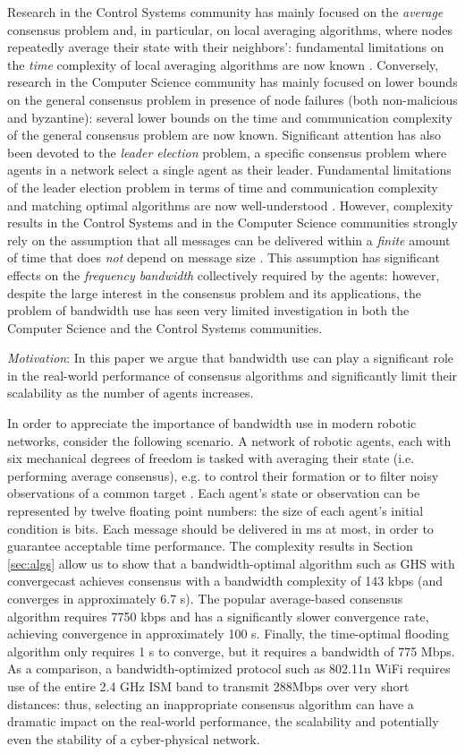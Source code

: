 \documentclass[letterpaper,10pt,conference]{ieeeconf}
\begin{document}
Research in the Control Systems community has mainly focused on the \emph{average} consensus problem and, in particular, on local averaging algorithms, where nodes repeatedly average their state with their neighbors': fundamental limitations on the \emph{time} complexity of local averaging algorithms are now known \cite{AO-JNT:07}.
Conversely, research in the Computer Science community has mainly focused on lower bounds on the general consensus problem in presence of node failures (both non-malicious and byzantine): several lower bounds on the time and communication complexity of the general consensus problem are now known. Significant attention has also been devoted to the  \emph{leader election} problem, a specific consensus problem where agents in a network select a single agent as their leader. Fundamental limitations of the leader election problem in terms of time and communication complexity and matching optimal algorithms are now well-understood \cite{NL:96}.
However, complexity results in the Control Systems and in the Computer Science communities strongly rely on the assumption that all messages can be delivered within a \emph{finite} amount of time that does \emph{not} depend on message size \cite{NL:96}. This assumption has significant effects on the \emph{frequency bandwidth} collectively required by the agents: however, despite the large interest in the consensus problem and its applications, the problem of bandwidth use has seen very limited investigation in both the Computer Science and the Control Systems communities. 

\emph{Motivation}:
In this paper we argue that bandwidth use can play a significant role in the real-world performance of consensus algorithms and significantly limit their scalability as the number of agents increases.

In order to appreciate the importance of bandwidth use in modern robotic networks, consider the following scenario. A network of  robotic agents, each with six mechanical degrees of freedom is tasked with averaging their state (i.e. performing average consensus), e.g. to control their formation \cite{WR-RWB-EMA:07} or to filter noisy observations of a common target \cite{ROS:07}. Each agent's state or observation can be represented by twelve floating point numbers:  the size of each agent's initial condition is  bits. Each message should be delivered in  ms at most, in order to guarantee acceptable time performance. The complexity results in Section \ref{sec:algs} allow us to show that a bandwidth-optimal algorithm such as GHS with convergecast achieves consensus with a bandwidth complexity of 143 kbps (and converges in approximately 6.7 s). The popular average-based consensus algorithm requires 7750 kbps and has a significantly slower convergence rate, achieving convergence in approximately 100 s. Finally, the time-optimal flooding algorithm only requires 1 s to converge, but it requires a bandwidth of 775 Mbps.
As a comparison, a bandwidth-optimized protocol such as 802.11n WiFi requires use of the entire 2.4 GHz ISM band to transmit 288Mbps over very short distances: thus, selecting an inappropriate consensus algorithm can have a dramatic impact on the real-world performance, the scalability and potentially even the stability of a cyber-physical network. 
\end{document}
